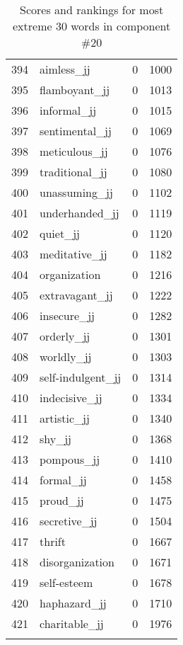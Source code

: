 \begin{longtable}[!htbp]{| rlr@{.}l |}
    394 & aimless\_jj & 0 & 1000 \\
    395 & flamboyant\_jj & 0 & 1013 \\
    396 & informal\_jj & 0 & 1015 \\
    397 & sentimental\_jj & 0 & 1069 \\
    398 & meticulous\_jj & 0 & 1076 \\
    399 & traditional\_jj & 0 & 1080 \\
    400 & unassuming\_jj & 0 & 1102 \\
    401 & underhanded\_jj & 0 & 1119 \\
    402 & quiet\_jj & 0 & 1120 \\
    403 & meditative\_jj & 0 & 1182 \\
    404 & organization & 0 & 1216 \\
    405 & extravagant\_jj & 0 & 1222 \\
    406 & insecure\_jj & 0 & 1282 \\
    407 & orderly\_jj & 0 & 1301 \\
    408 & worldly\_jj & 0 & 1303 \\
    409 & self-indulgent\_jj & 0 & 1314 \\
    410 & indecisive\_jj & 0 & 1334 \\
    411 & artistic\_jj & 0 & 1340 \\
    412 & shy\_jj & 0 & 1368 \\
    413 & pompous\_jj & 0 & 1410 \\
    414 & formal\_jj & 0 & 1458 \\
    415 & proud\_jj & 0 & 1475 \\
    416 & secretive\_jj & 0 & 1504 \\
    417 & thrift & 0 & 1667 \\
    418 & disorganization & 0 & 1671 \\
    419 & self-esteem & 0 & 1678 \\
    420 & haphazard\_jj & 0 & 1710 \\
    421 & charitable\_jj & 0 & 1976 \\
    \hline
    \caption{Scores and rankings for most extreme 30 words in component \#20} \\
\end{longtable}
